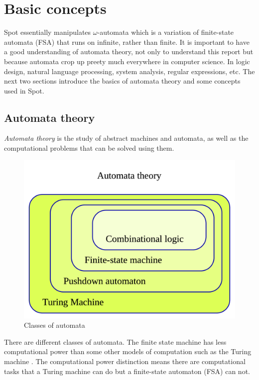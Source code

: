 \chapter{Basic concepts}
Spot essentially manipulates $\omega$-automata which is a variation of finite-state automata (FSA) that runs
on infinite, rather than finite. It is important to have a good understanding of automata theory,
not only to understand this report but because automata crop up preety much everywhere in computer
science. In logic design, natural language processing, system analysis, regular expressions, etc. The next
two sections introduce the basics of automata theory and some concepts used in Spot.

\section{Automata theory}
\textit{Automata theory} \cite{9} is the study of abstract machines and automata, as well as the
computational problems that can be solved using them.

\begin{figure}[H]
 \centering
 \includegraphics[scale=0.2]{img/automata_classes.png}
 \caption{Classes of automata \cite{9}}
 \label{fig:aut_classes}
\end{figure}
There are different classes of automata. The finite state machine has less computational power than
some other models of computation such as the Turing machine \cite{10}. The computational power distinction
means there are computational tasks that a Turing machine can do but a finite-state automaton (FSA) can
not.\\

